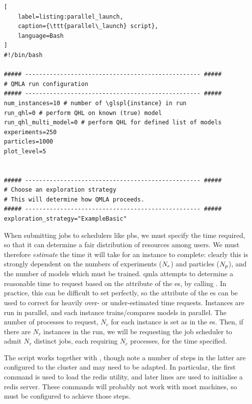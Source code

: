 \begin{lstlisting}[
    label=listing:parallel_launch,
    caption={\ttt{parallel\_launch} script},
    language=Bash
]
#!/bin/bash

##### -------------------------------------------------- #####
# QMLA run configuration
##### -------------------------------------------------- #####
num_instances=10 # number of \glspl{instance} in run
run_qhl=0 # perform QHL on known (true) model
run_qhl_multi_model=0 # perform QHL for defined list of models
experiments=250
particles=1000
plot_level=5


##### -------------------------------------------------- #####
# Choose an exploration strategy 
# This will determine how QMLA proceeds. 
##### -------------------------------------------------- #####
exploration_strategy="ExampleBasic"
\end{lstlisting}    

\par 

When submitting jobs to schedulers like \gls{pbs}, we must specify the time required, 
    so that it can determine a fair distribution of resources among users. 
We must therefore \emph{estimate} the time it will take for an \gls{instance} to complete:
    clearly this is strongly dependent on the numbers of experiments ($N_e$) and particles ($N_p$), 
    and the number of models which must be trained. 
\gls{qmla} attempts to determine a reasonable time to request based on the 
    attribute of the \gls{es}, by calling . 
In practice, this can be difficult to set perfectly,
    so the  attribute of the \gls{es} can be used to correct 
    for heavily over- or under-estimated time requests. 
Instances are run in parallel, and each \gls{instance} trains/compares models in parallel. 
The number of processes to request, $N_c$ for each \gls{instance} is set as  
        in the \gls{es}.
Then, if there are $N_r$ \glspl{instance} in the run, we will be requesting the job scheduler to admit 
    $N_r$ distinct jobs, each requiring $N_c$ processes, for the time specified. 

\par 

The  script works together with , 
    though note a number of steps in the latter are configured to the cluster and may need to be adapted. 
In particular, the first command is used to load the redis utility, and later lines are used to initialise a 
redis server. 
These commands will probably not work with most machines, so must be configured to achieve those steps. 


